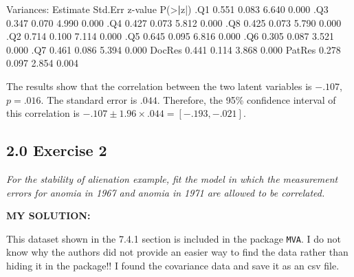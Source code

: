 \documentclass[
]{article}
\newenvironment{Shaded}{\begin{snugshade}}{\end{snugshade}}
\newcommand{\ErrorTok}[1]{\textcolor[rgb]{0.64,0.00,0.00}{\textbf{#1}}}
\newcommand{\FloatTok}[1]{\textcolor[rgb]{0.00,0.00,0.81}{#1}}
\newcommand{\FunctionTok}[1]{\textcolor[rgb]{0.00,0.00,0.00}{#1}}
\newcommand{\NormalTok}[1]{#1}
\newcommand{\SpecialCharTok}[1]{\textcolor[rgb]{0.00,0.00,0.00}{#1}}
\begin{document}
\begin{Shaded}
\begin{Highlighting}[]
\NormalTok{Variances}\SpecialCharTok{:}
\NormalTok{                   Estimate  Std.Err  z}\SpecialCharTok{{-}}\NormalTok{value  }\FunctionTok{P}\NormalTok{(}\SpecialCharTok{\textgreater{}}\ErrorTok{|}\NormalTok{z}\SpecialCharTok{|}\NormalTok{)}
\NormalTok{   .Q1                }\FloatTok{0.551}    \FloatTok{0.083}    \FloatTok{6.640}    \FloatTok{0.000}
\NormalTok{   .Q3                }\FloatTok{0.347}    \FloatTok{0.070}    \FloatTok{4.990}    \FloatTok{0.000}
\NormalTok{   .Q4                }\FloatTok{0.427}    \FloatTok{0.073}    \FloatTok{5.812}    \FloatTok{0.000}
\NormalTok{   .Q8                }\FloatTok{0.425}    \FloatTok{0.073}    \FloatTok{5.790}    \FloatTok{0.000}
\NormalTok{   .Q2                }\FloatTok{0.714}    \FloatTok{0.100}    \FloatTok{7.114}    \FloatTok{0.000}
\NormalTok{   .Q5                }\FloatTok{0.645}    \FloatTok{0.095}    \FloatTok{6.816}    \FloatTok{0.000}
\NormalTok{   .Q6                }\FloatTok{0.305}    \FloatTok{0.087}    \FloatTok{3.521}    \FloatTok{0.000}
\NormalTok{   .Q7                }\FloatTok{0.461}    \FloatTok{0.086}    \FloatTok{5.394}    \FloatTok{0.000}
\NormalTok{    DocRes            }\FloatTok{0.441}    \FloatTok{0.114}    \FloatTok{3.868}    \FloatTok{0.000}
\NormalTok{    PatRes            }\FloatTok{0.278}    \FloatTok{0.097}    \FloatTok{2.854}    \FloatTok{0.004}
\end{Highlighting}
\end{Shaded}

The results show that the correlation between the two latent variables
is \(-.107\), \(p =.016\). The standard error is \(.044\). Therefore,
the 95\% confidence interval of this correlation is
\(-.107 \pm 1.96 \times .044 = [-.193, -.021]\).

\hypertarget{exercise-2}{%
\subsection{2.0 Exercise 2}\label{exercise-2}}

\emph{For the stability of alienation example, fit the model in which
the measurement errors for anomia in 1967 and anomia in 1971 are allowed
to be correlated.}

\textbf{MY SOLUTION: }

This dataset shown in the 7.4.1 section is included in the package
\texttt{MVA}. I do not know why the authors did not provide an easier
way to find the data rather than hiding it in the package!! I found the
covariance data and save it as an csv file.
\end{document}
